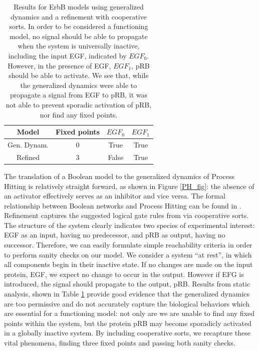 \documentclass{article}
\begin{document}
\begin{table}[h!]
\centering
  \begin{tabular}{|c|c|c|c|}
  \hline
    \textbf{Model} & \textbf{Fixed points} & $EGF_0$ & $EGF_1$ \\
  \hline
    Gen. Dynam. & 0 & True & True \\
  \hline
    Refined & 3 & False & True \\
  \hline

  \end{tabular}
   \caption{Results for ErbB models using generalized dynamics and a refinement with cooperative sorts. In order to be considered a functioning model, no signal should be able to propagate when the system is universally inactive, including the input EGF, indicated by $EGF_0$. However, in the presence of EGF, $EGF_1$, pRB should be able to activate. We see that, while the generalized dynamics were able to propagate a signal from EGF to pRB, it was not able to prevent sporadic activation of pRB, nor find any fixed points.}
   \label{egf}

\end{table}
The translation of a Boolean model to the generalized dynamics of Process Hitting is relatively straight forward, as shown in Figure \ref{PH_fig}: the absence of an activator effectively serves as an inhibitor and vice versa. The formal relationship between Boolean networks and Process Hitting can be found in \cite{FPIMR12-CMSB}. Refinement captures the suggested logical gate rules from \cite{Sahin09} via cooperative sorts. The structure of the system clearly indicates two species of experimental interest: EGF as an input, having no predecessor, and pRB as output, having no successor. Therefore, we can easily formulate simple reachability criteria in order to perform sanity checks on our model. We consider a system ``at rest'', in which all components begin in their inactive state. If no changes are made on the input protein, EGF, we expect no change to occur in the output. However if EFG is introduced, the signal should propagate to the output, pRB. Results from static analysis, shown in Table \ref{egf} provide good evidence that the generalized dynamics are too permissive and do not accurately capture the biological behaviors which are essential for a functioning model: not only are we are unable to find any fixed points within the system, but the protein pRB may become sporadicly activated in a globally inactive system. By including cooperative sorts, we recapture these vital phenomena, finding three fixed points and passing both sanity checks.
\end{document}
